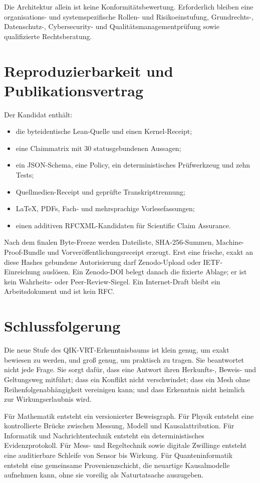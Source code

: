 \documentclass[11pt,a4paper,oneside]{article}
\begin{document}
Die Architektur allein ist keine Konformitätsbewertung. Erforderlich bleiben
eine organisations- und systemspezifische Rollen- und Risikoeinstufung,
Grundrechts-, Datenschutz-, Cybersecurity- und Qualitätsmanagementprüfung sowie
qualifizierte Rechtsberatung.

\section{Reproduzierbarkeit und Publikationsvertrag}

Der Kandidat enthält:

\begin{itemize}
  \item die byteidentische Lean-Quelle und einen Kernel-Receipt;
  \item eine Claimmatrix mit 30 statusgebundenen Aussagen;
  \item ein JSON-Schema, eine Policy, ein deterministisches Prüfwerkzeug und
  zehn Tests;
  \item Quellmedien-Receipt und geprüfte Transkripttrennung;
  \item LaTeX, PDFs, Fach- und mehrsprachige Vorlesefassungen;
  \item einen additiven RFCXML-Kandidaten für Scientific Claim Assurance.
\end{itemize}

Nach dem finalen Byte-Freeze werden Dateiliste, SHA-256-Summen,
Machine-Proof-Bundle und Vorveröffentlichungsreceipt erzeugt. Erst eine frische,
exakt an diese Hashes gebundene Autorisierung darf Zenodo-Upload oder
IETF-Einreichung auslösen. Ein Zenodo-DOI belegt danach die fixierte Ablage; er
ist kein Wahrheits- oder Peer-Review-Siegel. Ein Internet-Draft bleibt ein
Arbeitsdokument und ist kein RFC.

\section{Schlussfolgerung}

Die neue Stufe des QIK-VRT-Erkenntnisbaums ist klein genug, um exakt bewiesen
zu werden, und groß genug, um praktisch zu tragen. Sie beantwortet nicht jede
Frage. Sie sorgt dafür, dass eine Antwort ihren Herkunfts-, Beweis- und
Geltungsweg mitführt; dass ein Konflikt nicht verschwindet; dass ein Mesh ohne
Reihenfolgenabhängigkeit vereinigen kann; und dass Erkenntnis nicht heimlich
zur Wirkungserlaubnis wird.

Für Mathematik entsteht ein versionierter Beweisgraph. Für Physik entsteht
eine kontrollierte Brücke zwischen Messung, Modell und Kausalattribution. Für
Informatik und Nachrichtentechnik entsteht ein deterministisches
Evidenzprotokoll. Für Mess- und Regeltechnik sowie digitale Zwillinge entsteht
eine auditierbare Schleife von Sensor bis Wirkung. Für Quanteninformatik
entsteht eine gemeinsame Provenienzschicht, die neuartige Kausalmodelle
aufnehmen kann, ohne sie voreilig als Naturtatsache auszugeben.
\end{document}
